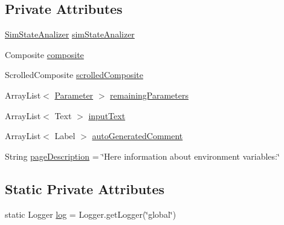 \subsection*{Private Attributes}
\begin{DoxyCompactItemize}
\item 
\hyperlink{classit_1_1isislab_1_1masonhelperdocumentation_1_1analizer_1_1_sim_state_analizer}{Sim\-State\-Analizer} \hyperlink{classit_1_1isislab_1_1masonhelperdocumentation_1_1mason_1_1wizards_1_1_h___environment_page_a7c2fe727aad8e12d87fd87203f4f8ec9}{sim\-State\-Analizer}
\item 
Composite \hyperlink{classit_1_1isislab_1_1masonhelperdocumentation_1_1mason_1_1wizards_1_1_h___environment_page_acd16b35445be03e0527a45d03cf61573}{composite}
\item 
Scrolled\-Composite \hyperlink{classit_1_1isislab_1_1masonhelperdocumentation_1_1mason_1_1wizards_1_1_h___environment_page_aed460345526f7b8e93de92025dbff70f}{scrolled\-Composite}
\item 
Array\-List$<$ \hyperlink{classit_1_1isislab_1_1masonhelperdocumentation_1_1analizer_1_1_parameter}{Parameter} $>$ \hyperlink{classit_1_1isislab_1_1masonhelperdocumentation_1_1mason_1_1wizards_1_1_h___environment_page_a3bfb6dff5b562361a410cd31ff8815ba}{remaining\-Parameters}
\item 
Array\-List$<$ Text $>$ \hyperlink{classit_1_1isislab_1_1masonhelperdocumentation_1_1mason_1_1wizards_1_1_h___environment_page_a297c64d886f958c23f954db7b953a46f}{input\-Text}
\item 
Array\-List$<$ Label $>$ \hyperlink{classit_1_1isislab_1_1masonhelperdocumentation_1_1mason_1_1wizards_1_1_h___environment_page_a5495002868c1d72f31f79a3e584fdd60}{auto\-Generated\-Comment}
\item 
String \hyperlink{classit_1_1isislab_1_1masonhelperdocumentation_1_1mason_1_1wizards_1_1_h___environment_page_ac8bda07b4ed1d63f8802efd712de59a0}{page\-Description} = \char`\"{}Here information about environment variables\-:\char`\"{}
\end{DoxyCompactItemize}
\subsection*{Static Private Attributes}
\begin{DoxyCompactItemize}
\item 
static Logger \hyperlink{classit_1_1isislab_1_1masonhelperdocumentation_1_1mason_1_1wizards_1_1_h___environment_page_a2867b3067a35681510d3186d568a830c}{log} = Logger.\-get\-Logger(\char`\"{}global\char`\"{})
\end{DoxyCompactItemize}


